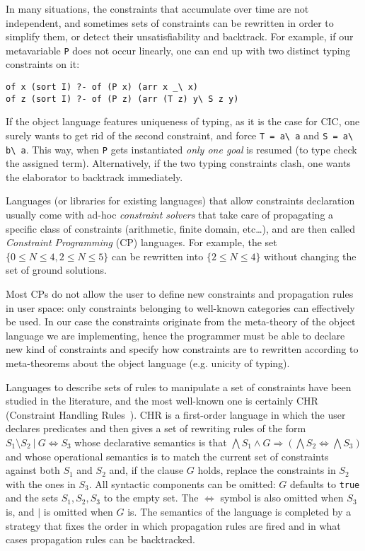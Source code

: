 \documentclass{easychair}
\begin{document}
In many situations, the constraints that accumulate over time are not
independent, and sometimes sets of constraints can be rewritten in
order to simplify them, or detect their unsatisfiability and
backtrack.
For example, if our metavariable \verb+P+ does not occur linearly, one 
can end up with two distinct typing constraints on it:

\begin{Verbatim}
of x (sort I) ?- of (P x) (arr x _\ x)
of z (sort I) ?- of (P z) (arr (T z) y\ S z y)
\end{Verbatim}

If the object language features uniqueness of typing, as it is the case
for CIC, one surely wants to get rid of the second constraint, and
force \verb+T = a\ a+ and \verb+S = a\ b\ a+.
This way, when \verb+P+ gets instantiated \emph{only one goal}
is resumed (to type check the assigned term).  Alternatively,
if the two typing constraints clash, one wants the elaborator to
backtrack immediately.

Languages (or libraries for existing languages) that allow constraints declaration usually
come with ad-hoc \emph{constraint solvers} that take care of
propagating a specific class of constraints (arithmetic, finite
domain, etc\ldots), and are then called \emph{Constraint
Programming} (CP) languages.  For example, the set $\{0 \leq N \leq
4, 2 \leq N \leq 5\}$ can be rewritten into $\{2 \leq N \leq 4\}$
without changing the set of ground solutions.

Most CPs do not allow the user to define new constraints and
propagation rules in user space: only constraints belonging to well-known categories can effectively be used.  In our case the constraints
originate from the meta-theory of the object language we are implementing,
hence the programmer must be able to declare new kind of constraints and
specify how constraints are to rewritten according to meta-theorems about the
object language (e.g. unicity of typing).

Languages to describe sets of rules to manipulate a set of
constraints have been studied in the literature, and the most well-known one is certainly CHR (Constraint Handling Rules~\cite{chr}).
CHR is a first-order language in which the user declares predicates
and then gives a set of rewriting rules of the form $S_1 \setminus S_2 ~|~
G \iff S_3$ whose declarative semantics is that $\bigwedge S_1 \wedge
G \Rightarrow (\bigwedge S_2 \iff \bigwedge S_3)$ and whose
operational semantics is to match the current set of constraints
against both $S_1$ and $S_2$ and, if the clause $G$ holds, replace the
constraints in $S_2$ with the ones in $S_3$. All syntactic components
can be omitted: $G$ defaults to \verb+true+ and the sets $S_1,S_2,S_3$
to the empty set. The $\iff$ symbol is also omitted when $S_3$ is, and
$|$ is omitted when $G$ is. The semantics of the language is completed
by a strategy that fixes the order in which propagation rules are
fired and in what cases propagation rules can be backtracked.
\end{document}

